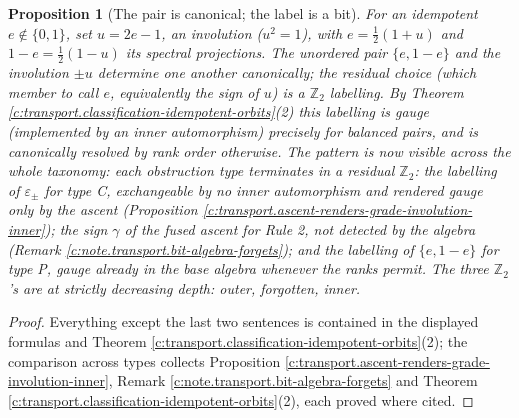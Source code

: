 \documentclass[11pt]{article}
\newtheorem{proposition}[theorem]{Proposition}
\theoremstyle{definition}
\theoremstyle{plain}
\begin{document}
\begin{proposition}[The pair is canonical; the label is a bit]\label{c:transport.pair-canonical-label-bit}
For an idempotent $e \notin \{0,1\}$, set $u = 2e - 1$, an involution ($u^2 = 1$), with $e = \tfrac12(1+u)$ and $1 - e = \tfrac12(1-u)$ its spectral projections. The unordered pair $\{e, 1-e\}$ and the involution $\pm u$ determine one another canonically; the residual choice (which member to call $e$, equivalently the sign of $u$) is a $\mathbb{Z}_2$ labelling. By Theorem \ref{c:transport.classification-idempotent-orbits}(2) this labelling is gauge (implemented by an inner automorphism) precisely for balanced pairs, and is canonically resolved by rank order otherwise. The pattern is now visible across the whole taxonomy: each obstruction type terminates in a residual $\mathbb{Z}_2$: the labelling of $\varepsilon_\pm$ for type C, exchangeable by no inner automorphism and rendered gauge only by the ascent (Proposition \ref{c:transport.ascent-renders-grade-involution-inner}); the sign $\gamma$ of the fused ascent for Rule 2, not detected by the algebra (Remark \ref{c:note.transport.bit-algebra-forgets}); and the labelling of $\{e, 1-e\}$ for type P, gauge already in the base algebra whenever the ranks permit. The three $\mathbb{Z}_2$'s are at strictly decreasing depth: outer, forgotten, inner.
\end{proposition}
\begin{proof}
Everything except the last two sentences is contained in the displayed formulas and Theorem \ref{c:transport.classification-idempotent-orbits}(2); the comparison across types collects Proposition \ref{c:transport.ascent-renders-grade-involution-inner}, Remark \ref{c:note.transport.bit-algebra-forgets} and Theorem \ref{c:transport.classification-idempotent-orbits}(2), each proved where cited.

\end{proof}
\end{document}
